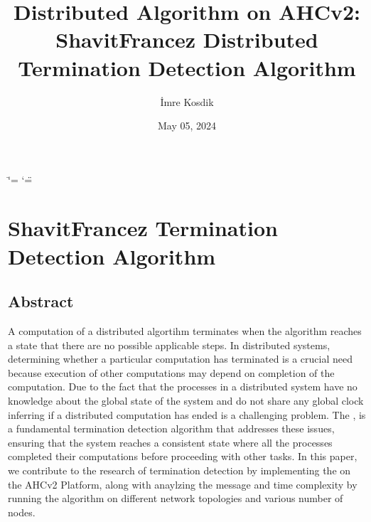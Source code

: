 \documentclass[letterpaper,10pt,english]{sphinxmanual}
\title{Distributed Algorithm on AHCv2: Shavit\sphinxhyphen{}Francez Distributed Termination Detection Algorithm}
\date{May 05, 2024}
\author{İmre Kosdik}
\begin{document}
\ifdefined\shorthandoff
  \ifnum\catcode`\=\string=\active\shorthandoff{=}\fi
  \ifnum\catcode`\"=\active{}\fi
\fi

\pagestyle{empty}
\sphinxmaketitle
\pagestyle{plain}
\sphinxtableofcontents
\pagestyle{normal}
\label{\detokenize{index::doc}}


\sphinxstepscope


\chapter{Shavit\sphinxhyphen{}Francez Termination Detection Algorithm}
\label{\detokenize{docs/ShavitFrancez/ShavitFrancez:shavitfrancezalg}}\label{\detokenize{docs/ShavitFrancez/ShavitFrancez::doc}}
\sphinxstepscope


\section{Abstract}
\label{\detokenize{docs/ShavitFrancez/abstract:abstract}}\label{\detokenize{docs/ShavitFrancez/abstract::doc}}
\sphinxAtStartPar
A computation of a distributed algortihm terminates when the algorithm reaches a state that there are no possible applicable steps. In distributed systems, determining whether a particular computation has terminated is a crucial need because execution of other computations may depend on completion of the computation. Due to the fact that the processes in a distributed system have no knowledge about the global state of the system and do not share any global clock inferring if a distributed computation has ended is a challenging problem. The {\hyperref[\detokenize{docs/ShavitFrancez/algorithm:shavitfrancezterminationdetectionalgorithm}]{}}, is a fundamental termination detection algorithm that addresses these issues, ensuring that the system reaches a consistent state where all the processes completed their computations before proceeding with other tasks. In this paper, we contribute to the research of termination detection by implementing the {\hyperref[\detokenize{docs/ShavitFrancez/algorithm:shavitfrancezterminationdetectionalgorithm}]{}} on the AHCv2 Platform, along with anaylzing the message and time complexity by running the algorithm on different network topologies and various number of nodes.

\sphinxstepscope
\end{document}
